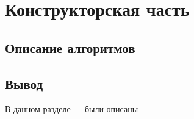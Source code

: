 \chapter{Конструкторская часть}

\section{Описание алгоритмов}
\begin{center}	
%	
\end{center}

\section*{Вывод}
В данном разделе --- были описаны 